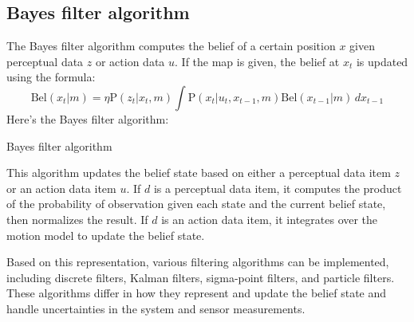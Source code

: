\subsection{Bayes filter algorithm}
The Bayes filter algorithm computes the belief of a certain position $x$ given perceptual data $z$ or action data $u$. 
If the map is given, the belief at $x_t$ is updated using the formula:
\[\text{Bel}(x_t|m)=\eta\text{P}(z_t|x_t,m)\int\text{P}(x_t|u_t,x_{t-1},m)\text{Bel}(x_{t-1}|m)\,dx_{t-1}\]
Here's the Bayes filter algorithm:
\begin{algorithm}[H]
    \caption{Bayes filter algorithm}
        \begin{algorithmic}[1]
                \EndFor
                \EndFor
            \EndIf
            \State {}
        \end{algorithmic}
\end{algorithm}
This algorithm updates the belief state based on either a perceptual data item $z$ or an action data item $u$. 
If $d$ is a perceptual data item, it computes the product of the probability of observation given each state and the current belief state, then normalizes the result.
If $d$ is an action data item, it integrates over the motion model to update the belief state.

Based on this representation, various filtering algorithms can be implemented, including discrete filters, Kalman filters, sigma-point filters, and particle filters. 
These algorithms differ in how they represent and update the belief state and handle uncertainties in the system and sensor measurements.

